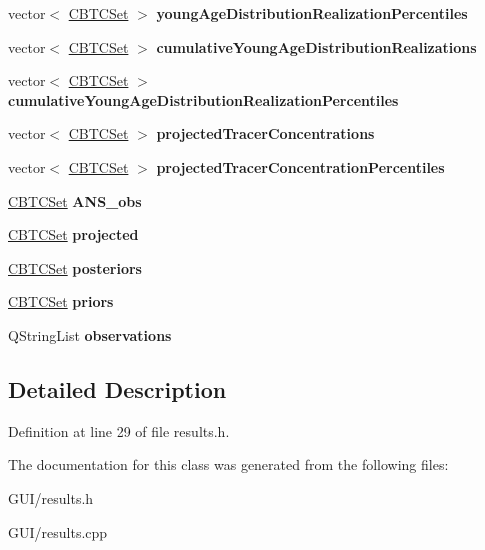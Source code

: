 \begin{DoxyCompactItemize}
\item 
\mbox{\label{class_results_a861840004d72234736bd588c72954b91}} 
vector$<$ \hyperlink{class_c_b_t_c_set}{C\+B\+T\+C\+Set} $>$ {\bfseries young\+Age\+Distribution\+Realization\+Percentiles}
\item 
\mbox{\label{class_results_a7cd8da7cbb53413bbaf0b3e918c50e22}} 
vector$<$ \hyperlink{class_c_b_t_c_set}{C\+B\+T\+C\+Set} $>$ {\bfseries cumulative\+Young\+Age\+Distribution\+Realizations}
\item 
\mbox{\label{class_results_a0f2ab029d6683d80f481a4f6ad939e6d}} 
vector$<$ \hyperlink{class_c_b_t_c_set}{C\+B\+T\+C\+Set} $>$ {\bfseries cumulative\+Young\+Age\+Distribution\+Realization\+Percentiles}
\item 
\mbox{\label{class_results_ae723c5e9545368badf98de4af4d25925}} 
vector$<$ \hyperlink{class_c_b_t_c_set}{C\+B\+T\+C\+Set} $>$ {\bfseries projected\+Tracer\+Concentrations}
\item 
\mbox{\label{class_results_a74f866c51bee18fdc248127cf3459a1c}} 
vector$<$ \hyperlink{class_c_b_t_c_set}{C\+B\+T\+C\+Set} $>$ {\bfseries projected\+Tracer\+Concentration\+Percentiles}
\item 
\mbox{\label{class_results_a9ab004484e53783d1056a397704e6428}} 
\hyperlink{class_c_b_t_c_set}{C\+B\+T\+C\+Set} {\bfseries A\+N\+S\+\_\+obs}
\item 
\mbox{\label{class_results_a5095b5aee3f6f1d38f4a7589dd836a17}} 
\hyperlink{class_c_b_t_c_set}{C\+B\+T\+C\+Set} {\bfseries projected}
\item 
\mbox{\label{class_results_a89ccfdd130022e4ec71670a34cc3c8bb}} 
\hyperlink{class_c_b_t_c_set}{C\+B\+T\+C\+Set} {\bfseries posteriors}
\item 
\mbox{\label{class_results_abca3a69b3a1e0d8bee045ae4cc54dd6a}} 
\hyperlink{class_c_b_t_c_set}{C\+B\+T\+C\+Set} {\bfseries priors}
\item 
\mbox{\label{class_results_af35061ee6ca85296739f2c3ab74af254}} 
Q\+String\+List {\bfseries observations}
\end{DoxyCompactItemize}


\subsection{Detailed Description}


Definition at line 29 of file results.\+h.



The documentation for this class was generated from the following files\+:\begin{DoxyCompactItemize}
\item 
G\+U\+I/results.\+h\item 
G\+U\+I/results.\+cpp\end{DoxyCompactItemize}
